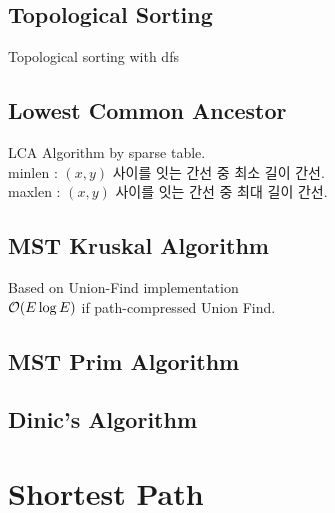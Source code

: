 \documentclass[landscape,8pt]{article}
\begin{document}
\begin{multicols}{2}
  \subsection{Topological Sorting}
  Topological sorting with dfs
    

  \subsection{Lowest Common Ancestor}
  LCA Algorithm by sparse table.\\
  minlen : $(x, y)$ 사이를 잇는 간선 중 최소 길이 간선.\\
  maxlen : $(x, y)$ 사이를 잇는 간선 중 최대 길이 간선.
    

  \subsection{MST Kruskal Algorithm}
  Based on Union-Find implementation\\
  $\order{E \log E}$ if path-compressed Union Find.
    

  \subsection{MST Prim Algorithm}
    

  \subsection{Dinic's Algorithm}
    



\columnbreak

\section{Shortest Path}

\end{multicols}
\end{document}
